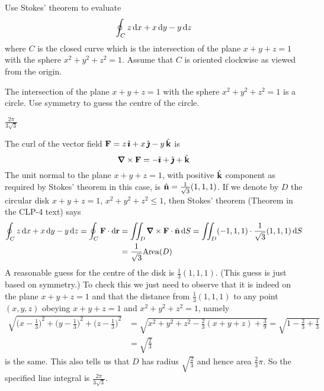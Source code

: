 \begin{question}[M317 2002A] %
Use Stokes' theorem to evaluate 
$$
\oint_C z\,\mathrm{d}x+x\,\mathrm{d}y-y\,\mathrm{d}z
$$
where $C$ is the  closed curve which is the intersection of the plane $x+y+z=1$
with the sphere $x^2+y^2+z^2=1$. Assume that $C$ is oriented  clockwise
as viewed from the origin.
\end{question}

\begin{hint} 
The intersection of the plane $x+y+z=1$ with the sphere $x^2+y^2+z^2=1$
is a circle. Use symmetry to guess the centre of the circle.
\end{hint}

\begin{answer} 
$\frac{2\pi}{3\sqrt{3}}$
\end{answer}

\begin{solution} 
The curl of the vector field $\mathbf{F}=z\,\hat{\pmb{\imath}}+x\,\hat{\pmb{\jmath}}-y\,\hat{\mathbf{k}}$ is
$$
\vnabla\times\vF=-\hi+\hj+\hk
$$
The unit normal to the plane $x+y+z=1$, with positive $\hat{\mathbf{k}}$ component as
required by Stokes' theorem in this case, is $\hat{\mathbf{n}}=\frac{1}{\sqrt{3}}(1,1,1)$.
If we denote by $D$ the circular disk $x+y+z=1$, $x^2+y^2+z^2\le 1$, then 
Stokes' theorem (Theorem  in the CLP-4 text) says
\begin{align*}
\oint_C z\,\dee{x}+x\,\dee{y}-y\,\dee{z}=\oint_C \vF\cdot \dee{\vr}
&=\dblInt_D\vnabla\times\vF\cdot\hn\,\dee{S}
=\dblInt_D(-1,1,1)\cdot\frac{1}{\sqrt{3}}(1,1,1)\,\dee{S} \\
&=\frac{1}{\sqrt{3}}{\rm Area}(D)
\end{align*}
A reasonable guess for the centre of the disk is $\frac{1}{3}(1,1,1)$. 
(This guess is just based on symmetry.) To check
this we just need to observe that it is indeed on the plane $x+y+z=1$
and that the distance from  $\frac{1}{3}(1,1,1)$ to any point $(x,y,z)$
obeying $x+y+z=1$ and $x^2+y^2+z^2=1$, namely
\begin{align*}
\sqrt{{\Big(x-\frac{1}{3}\Big)}^2+{\Big(y-\frac{1}{3}\Big)}^2
+{\Big(z-\frac{1}{3}\Big)}^2}
&=\sqrt{x^2+y^2+z^2-\frac{2}{3}(x+y+z)+\frac{3}{9}}
=\sqrt{1-\frac{2}{3}+\frac{1}{3}}\\
&=\sqrt{\frac{2}{3}}
\end{align*}
is the same. This also tells us that $D$ has radius 
$\sqrt{\frac{2}{3}}$ and hence area $\frac{2}{3}\pi$. So the specified
line integral is $\frac{2\pi}{3\sqrt{3}}$.
\end{solution}


